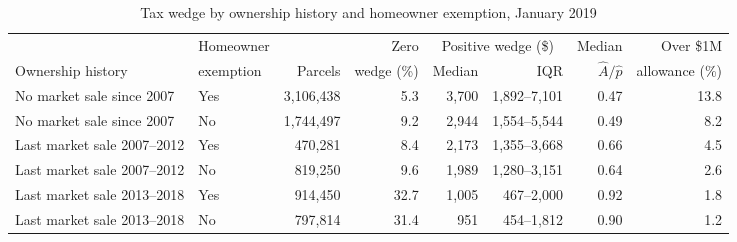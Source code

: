 \begin{table}[!ht]\centering
\caption{Tax wedge by ownership history and homeowner exemption, January 2019}\label{tab:wedge_tenure}
\begin{adjustbox}{max width=\textwidth}{\small\setlength{\tabcolsep}{4pt}
\begin{tabular}{llrrrrrr}\toprule
 & Homeowner & & Zero & \multicolumn{2}{c}{Positive wedge (\$)} & Median & Over \$1M \\
Ownership history & exemption & Parcels & wedge (\%) & Median & IQR & $\hat A/\hat p$ & allowance (\%) \\\midrule
No market sale since 2007 & Yes & 3,106,438 & 5.3 & 3,700 & 1,892--7,101 & 0.47 & 13.8 \\
No market sale since 2007 & No & 1,744,497 & 9.2 & 2,944 & 1,554--5,544 & 0.49 & 8.2 \\
Last market sale 2007--2012 & Yes & 470,281 & 8.4 & 2,173 & 1,355--3,668 & 0.66 & 4.5 \\
Last market sale 2007--2012 & No & 819,250 & 9.6 & 1,989 & 1,280--3,151 & 0.64 & 2.6 \\
Last market sale 2013--2018 & Yes & 914,450 & 32.7 & 1,005 & 467--2,000 & 0.92 & 1.8 \\
Last market sale 2013--2018 & No & 797,814 & 31.4 & 951 & 454--1,812 & 0.90 & 1.2 \\
\bottomrule\end{tabular}}\end{adjustbox}
\begin{minipage}{0.96\textwidth}\end{minipage}\end{table}
